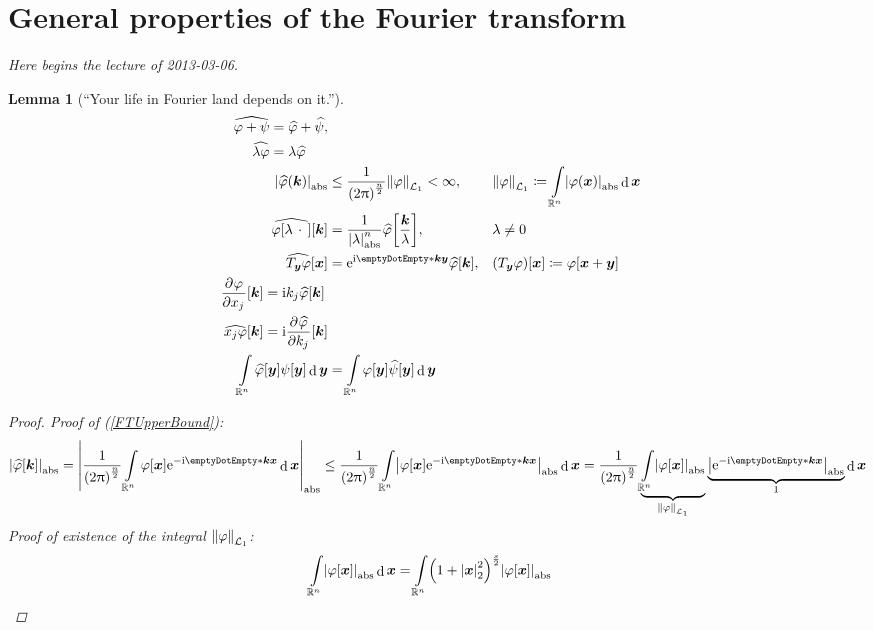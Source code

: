 \documentclass[10pt]{article}
\newtheorem*{lemma}{Lemma}
\DeclarePairedDelimiter\doubleBars{\Vert}{\Vert}
\DeclarePairedDelimiter\singleBars{\lvert}{\rvert}
\DeclarePairedDelimiter\parentheses{\lparen}{\rparen}
\DeclarePairedDelimiter\squareBrackets{[}{]}
\newcommand\I{\mathrm{i}}
\newcommand\E{\mathrm{e}}
\DeclareMathOperator{\diffd}{d}
\newcommand\ft\widehat
\newcommand\pderiv[3][]{\frac{\partial^{#1} #3}{{\partial {#2}}^{#1}}}
\newcommand{\R}{\mathbb{R}}
\newcommand\of[1]{\parentheses*{#1}}
\newcommand\pa[1]{\parentheses*{#1}}
\newcommand\abs[1]{\singleBars*{#1}}
\newcommand\norm[1]{\singleBars*{#1}}
\newcommand\Lnorm[2][\infty]{\doubleBars*{#2}_{#1}}
\newcommand\scal[2]{\emptyDotEmpty*{#1}{#2}}
\newcommand\gl\lambda
\newcommand\gj\varphi
\newcommand\gy\psi
\newcommand{\vx}{{\vectorsym x}}
\newcommand{\vy}{{\vectorsym y}}
\newcommand{\vk}{{\vectorsym k}}
\newcommand\placeholder{\,\:\cdot\:\,}
\renewcommand\of[1]{\squareBrackets*{#1}}
\renewcommand\norm[1]{\singleBars*{#1}_{2}}
\renewcommand\abs[1]{\singleBars*{#1}_{\mathrm{abs}}}
\renewcommand\Lnorm[2][\infty]{\doubleBars*{#2}_{\mathcal{L}_{#1}}}
\newcommand\Int[1]{\int\limits_{#1}}
\newcommand{\Rn}{{\R^n}}
\newcommand{\ftnrm}{\frac{1}{\pa{2\Pi}^\frac{n}{2}} }
\begin{document}
  \section{General properties of the Fourier transform}
  \noindent \emph{Here begins the lecture of 2013-03-06.}
  \begin{lemma}[``Your life in Fourier land depends on it.'']
    \begin{align}
      \label{FTLinearity}
      \begin{split}      
      \ft{\gj + \gy} &= \ft{\gj} + \ft{\gy},\\
      \ft{\gl \gj} &= \gl \ft{\gj} 
      \end{split}
      \\
      \label{FTUpperBound}
      \abs{\ft{\gj}(\vk)} &\leq \ftnrm\Lnorm[1]{\gj}<\infty, &&
      \Lnorm[1]{\gj} \coloneqq \Int\Rn \abs{\gj(\vx)} \diffd \vx
      \\
      \label{FTScaling}
      \ft{\gj\of{\gl\placeholder}}\of\vk &= \frac{1}{\abs{\gl}^n}\ft{\gj}\of{\frac\vk\gl}, &&
      \gl\neq 0
      \\
      \label{FTTranslation}
      \ft{T_\vy\gj}\of\vx &= \E^{\I\scal\vk\vy}\ft\gj\of\vk, &&
      \pa{T_\vy\gj}\of\vx \coloneqq \gj\of{\vx+\vy}
      \\
      \label{FTDerivative}
      \begin{split}
      \pderiv{x_j}\gj\of\vk &= \I k_j \ft\gj\of\vk \\ 
      \ft{x_j \gj}\of\vk &= \I \pderiv{k_j}{\ft\gj} \of\vk
      \end{split}
      \\
      \label{FTUnitary}
      \Int\Rn\ft\gj\of\vy \gy\of\vy \diffd\vy &= \Int\Rn \gj\of\vy \ft\gy\of\vy \diffd\vy
    \end{align}
    \begin{proof}
      Proof of (\ref{FTUpperBound}):
      \begin{equation*}
       \abs{\ft\gj\of\vk} 
        = \abs{\ftnrm\Int\Rn \gj\of\vx \E^{-\I \scal\vk\vx}\diffd\vx} 
        \leq \ftnrm\Int\Rn \abs{\gj\of\vx 
        \E^{-\I \scal\vk\vx}}\diffd\vx  = \ftnrm
        \underbrace{\Int\Rn \abs{\gj\of\vx}}_{\Lnorm[1]{\gj}}
        \underbrace{\abs{\E^{-\I\scal\vk\vx}}}_{1}\diffd\vx \\
      \end{equation*}
      Proof of existence of the integral $\Lnorm[1]\gj$:
      \begin{align*}
        \Int\Rn\abs{\gj\of\vx}\diffd\vx 
        &= \Int\Rn\pa{1+\norm{\vx}^2}^\frac{s}{2}\abs{\gj\of\vx}

\end{align*}
\end{proof}
\end{lemma}
\end{document}

